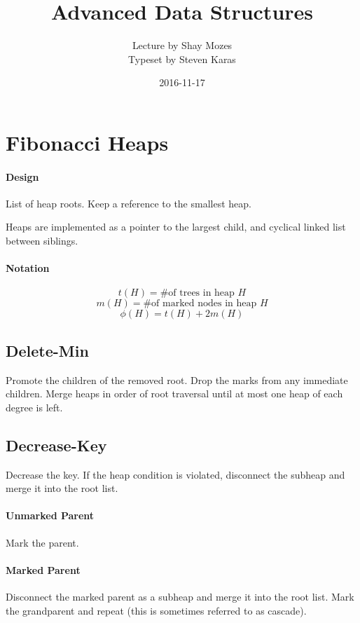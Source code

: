 \documentclass[a4paper]{article}
\title{Advanced Data Structures}
\date{2016-11-17}
\author{Lecture by Shay Mozes\\Typeset by Steven Karas}
\begin{document}
\maketitle

\section{Fibonacci Heaps}

\paragraph{Design}
List of heap roots. Keep a reference to the smallest heap.

Heaps are implemented as a pointer to the largest child, and cyclical linked list between siblings.

\paragraph{Notation}

\[t(H)=\text{\# of trees in heap }H\]
\[m(H)=\text{\# of marked nodes in heap }H\]
\[\phi(H)=t(H)+2m(H)\]

\subsection{Delete-Min}
Promote the children of the removed root. Drop the marks from any immediate children. Merge heaps in order of root traversal until at most one heap of each degree is left.

\subsection{Decrease-Key}
Decrease the key. If the heap condition is violated, disconnect the subheap and merge it into the root list.

\paragraph{Unmarked Parent}
Mark the parent.

\paragraph{Marked Parent}
Disconnect the marked parent as a subheap and merge it into the root list. Mark the grandparent and repeat (this is sometimes referred to as cascade).
\end{document}
